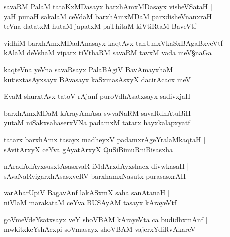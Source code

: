 \begin{shloka}
savaRM PalaM tataKxMDasayx barxhAmxMDasayx visheVSataH |\\
yaH punaH sakalaM ceVdaM barxhAmxMDaM parxdisheVnanxraH |\\
teVna datatxM hutaM japatxM paThitaM kiVtiRtaM BaveVtf 
\end{shloka}

\begin{shloka}
vidhiM barxhAmxMDadAnasayx kaqtAvx tanUmxVkaSxBAgaBxveVtf |\\
kAlaM deVshaM viparx tiVthaRM savaRM tavxM vada meV\S naGa
\end{shloka}

\begin{shloka}
kaqteVna yeVna savaRsayx PalaBAgiV BavAmayxhaM |\\
kutisxtasAyxsayx BAvasayx kaSxmasAsxyX dacirAcacx meV 
\end{shloka}

\begin{shloka}
EvaM shurxtAvx tatoV rAjanf puroVdhAsatxsayx sadivxjaH 
\end{shloka}

\begin{shloka}
barxhAmxMDaM kArayAmAsa swvaNaRM savaRdhAtuBiH |\\
yutaM niSakxsahaserxVNa padamxM tatarx hayxkalapxyatf
\end{shloka}

\begin{shloka}
tatarx barxhAmx tasayx madheyxV padamxrAgeYralaMkaqtaH |\\
sAvitArxyX ceYva gAyatArxyX QuSiBimuRniBisasxha
\end{shloka}

\begin{shloka}
nAradAdAyxsusxtAsasxvaR iMdArxdAyxshacx divwkasaH |\\
sAvaNaRvigarxhAsasxveRV barxhamxNasutx purasasxrAH 
\end{shloka}

\begin{shloka}
varAharUpiV BagavAnf lakASxmX saha sanAtanaH |\\
niVlaM marakataM ceYva BUSAyAM tasayx kArayeVtf 
\end{shloka}

\begin{shloka}
goVmeVdeYsatxsayx veY shoVBAM kArayeVta ca budidhxmAnf |\\
mwkitxkeYshAcxpi soVmasayx shoVBAM vajerxYdiRvAkareV 
\end{shloka}

